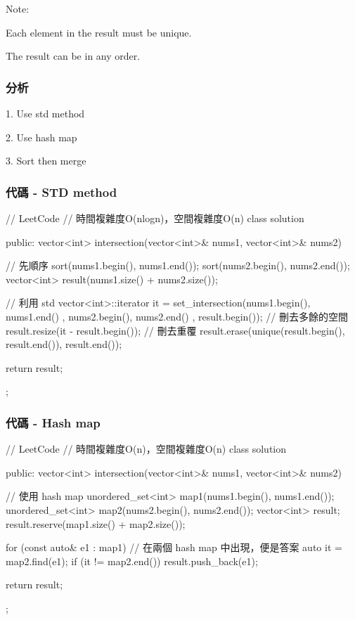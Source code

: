Note:
\begindot
\item Each element in the result must be unique.
\item The result can be in any order.
\myenddot

\subsubsection{分析}
1. Use std method\newline

2. Use hash map\newline

3. Sort then merge\newline

\subsubsection{代碼 - STD method}
\begin{Code}
// LeetCode
// 時間複雜度O(nlogn)，空間複雜度O(n)
class solution{
public:
    vector<int> intersection(vector<int>& nums1, vector<int>& nums2) {
        // 先順序
        sort(nums1.begin(), nums1.end());
        sort(nums2.begin(), nums2.end());
        vector<int> result(nums1.size() + nums2.size());

        // 利用 std
        vector<int>::iterator it = set_intersection(nums1.begin(), nums1.end()
                                                    , nums2.begin(), nums2.end()
                                                    , result.begin());
        // 刪去多餘的空間
        result.resize(it - result.begin());
        // 刪去重覆
        result.erase(unique(result.begin(), result.end()), result.end());

        return result;
    }
};
\end{Code}

\subsubsection{代碼 - Hash map}
\begin{Code}
// LeetCode
// 時間複雜度O(n)，空間複雜度O(n)
class solution{
public:
    vector<int> intersection(vector<int>& nums1, vector<int>& nums2) {
        // 使用 hash map
        unordered_set<int> map1(nums1.begin(), nums1.end());
        unordered_set<int> map2(nums2.begin(), nums2.end());
        vector<int> result; result.reserve(map1.size() + map2.size());

        for (const auto& e1 : map1) {
            // 在兩個 hash map 中出現，便是答案
            auto it = map2.find(e1);
            if (it != map2.end()) result.push_back(e1);
        }

        return result;
    }
};
\end{Code}

